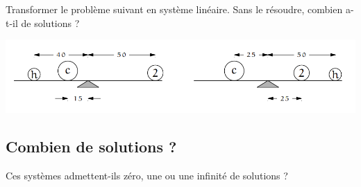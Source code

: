   \vspace{1em}

  Transformer le problème suivant en système linéaire. Sans le résoudre, combien a-t-il de solutions ?
  \begin{center}
    \includegraphics[width=0.8\linewidth]{0-Revisions/2-PivotDeGauss/equilibre.png}
  \end{center}

  \newpage

  \vspace{2em}

  \subsection{Combien de solutions ?}
Ces systèmes admettent-ils zéro, une ou une infinité de solutions ?

